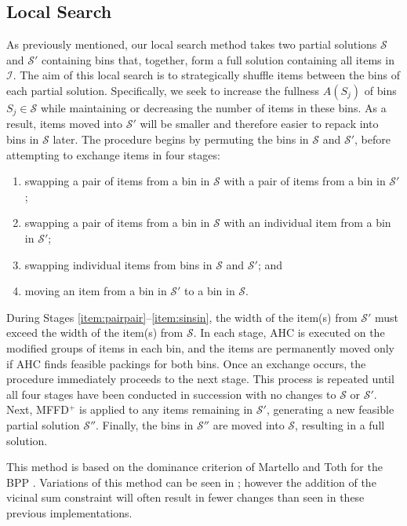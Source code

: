 \documentclass[a4paper,11pt,authoryear]{elsarticle}
\begin{document}
\subsection{Local Search}
\label{sub:localsearch}
\noindent As previously mentioned, our local search method takes two partial solutions $\mathcal{S}$ and $\mathcal{S}'$ containing bins that, together, form a full solution containing all items in $\mathcal{I}$. The aim of this local search is to strategically shuffle items between the bins of each partial solution. Specifically, we seek to increase the fullness $A(S_j)$ of bins $S_j \in \mathcal{S}$ while maintaining or decreasing the number of items in these bins. As a result, items moved into $\mathcal{S}'$ will be smaller and therefore easier to repack into bins in $\mathcal{S}$ later. The procedure begins by permuting the bins in $\mathcal{S}$ and $\mathcal{S}'$, before attempting to exchange items in four stages:
\begin{enumerate}[label={(\arabic*)},itemsep=-0.2em]
	\item swapping a pair of items from a bin in $\mathcal{S}$ with a pair of items from a bin in $\mathcal{S}'$;\label{item:pairpair}
	\item swapping a pair of items from a bin in $\mathcal{S}$ with an individual item from a bin in $\mathcal{S}'$;\label{item:pairsin}
	\item swapping individual items from bins in $\mathcal{S}$ and $\mathcal{S}'$;\label{item:sinsin} and
	\item moving an item from a bin in $\mathcal{S}'$ to a bin in $\mathcal{S}$.\label{item:movesin}
\end{enumerate} 
During Stages \ref{item:pairpair}--\ref{item:sinsin}, the width of the item(s) from $\mathcal{S}'$ must exceed the width of the item(s) from $\mathcal{S}$. In each stage, AHC is executed on the modified groups of items in each bin, and the items are permanently moved only if AHC finds feasible packings for both bins. Once an exchange occurs, the procedure immediately proceeds to the next stage. This process is repeated until all four stages have been conducted in succession with no changes to $\mathcal{S}$ or $\mathcal{S}'$. Next, MFFD$^+$ is applied to any items remaining in $\mathcal{S}'$, generating a new feasible partial solution $\mathcal{S}''$. Finally, the bins in $\mathcal{S}''$ are moved into $\mathcal{S}$, resulting in a full solution.

This method is based on the dominance criterion of Martello and Toth for the BPP \cite{martello1990l}. Variations of this method can be seen in \cite{lewis2009, lewis2017, falkenauer1996, levine2004}; however the addition of the vicinal sum constraint will often result in fewer changes than seen in these previous implementations.
\end{document}
